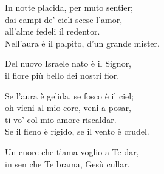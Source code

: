 
\strofa In notte placida, per muto sentier;\\
dai campi de' cieli scese l'amor,\\
all'alme fedeli il redentor.\\
Nell'aura è il palpito, d'un grande mister.

\spazio

Del nuovo Israele nato è il Signor,\\
il fiore più bello dei nostri fior. 

\spazio

 

\spazio

\strofa Se l'aura è gelida, se fosco è il ciel;\\
oh vieni al mio core, veni a posar,\\
ti vo' col mio amore riscaldar.\\
Se il fieno è rigido, se il vento è crudel.

\spazio

Un cuore che t'ama voglio a Te dar,\\
in sen che Te brama, Gesù cullar. 

\spazio

